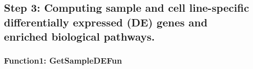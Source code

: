 \documentclass[]{article}
\begin{document}
\hypertarget{step-3-computing-sample-and-cell-line-specific-differentially-expressed-de-genes-and-enriched-biological-pathways.}{%
\subsection{\texorpdfstring{ Step 3: Computing sample and cell line-specific differentially expressed (DE) genes and enriched biological pathways.}{  Step 3: Computing sample and cell line-specific differentially expressed (DE) genes and enriched biological pathways.}}\label{step-3-computing-sample-and-cell-line-specific-differentially-expressed-de-genes-and-enriched-biological-pathways.}}

\hypertarget{function1-getsampledefun}{%
\subsubsection{\texorpdfstring{ Function1: GetSampleDEFun}{  Function1: GetSampleDEFun}}\label{function1-getsampledefun}}
\end{document}
